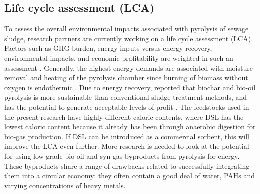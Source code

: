 \subsection{Life cycle assessment (LCA) \label{sec:LCA}}
To assess the overall environmental impacts associated with pyrolysis of sewage sludge, research partners are currently working on a life cycle assessment (LCA). Factors such as GHG burden, energy inputs versus energy recovery, environmental impacts, and economic profitability are weighted in such an assessment \citep{huang2022comparative}. Generally, the highest energy demands are associated with moisture removal and heating of the pyrolysis chamber since burning of biomass without oxygen is endothermic \citep{mcnamara2016pyrolysis}. Due to energy recovery, \cite{huang2022comparative} reported that biochar and bio-oil pyrolysis is more sustainable than conventional sludge treatment methods, and has the potential to generate acceptable levels of profit \cite{huang2022comparative}. The feedstocks used in the present research have highly different caloric contents, where DSL has the lowest caloric content because it already has been through anaerobic digestion for bio-gas production. If DSL can be introduced as a commercial sorbent, this will improve the LCA even further. More research is needed to look at the potential for using low-grade bio-oil and syn-gas byproducts from pyrolysis for energy. These byproducts share a range of drawbacks related to successfully integrating them into a circular economy: they often contain a good deal of water, PAHs and varying concentrations of heavy metals. 



 







